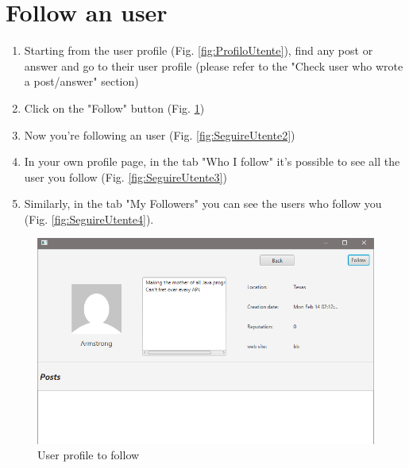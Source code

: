\documentclass[11pt]{report}
\begin{document}
\section{Follow an user}
\begin{enumerate}
    \item Starting from the user profile (Fig. \ref{fig:ProfiloUtente}), find any post or answer and go to their user profile (please refer to the "Check user who wrote a post/answer" section)
    \item Click on the "Follow" button (Fig. \ref{fig:SeguireUtente1})
    \item Now you're following an user (Fig. \ref{fig:SeguireUtente2})
    \item In your own profile page, in the tab "Who I follow" it's possible to see all the user you follow (Fig. \ref{fig:SeguireUtente3})
    \item Similarly, in the tab "My Followers" you can see the users who follow you (Fig. \ref{fig:SeguireUtente4}).
\end{enumerate}
\begin{figure}[H]
  \centering
  \includegraphics[width=\textwidth,keepaspectratio=true]{img/user_manual/SeguireUtente1.png}
  \caption{User profile to follow}
  \label{fig:SeguireUtente1}
\end{figure}
\end{document}
